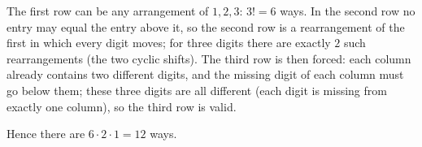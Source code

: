The first row can be any arrangement of $1,2,3$: $3!=6$ ways. In the second row no entry may equal the entry above it, so the second row is a rearrangement of the first in which every digit moves; for three digits there are exactly $2$ such rearrangements (the two cyclic shifts). The third row is then forced: each column already contains two different digits, and the missing digit of each column must go below them; these three digits are all different (each digit is missing from exactly one column), so the third row is valid.

Hence there are $6\cdot2\cdot1=\boxed{12}$ ways.
